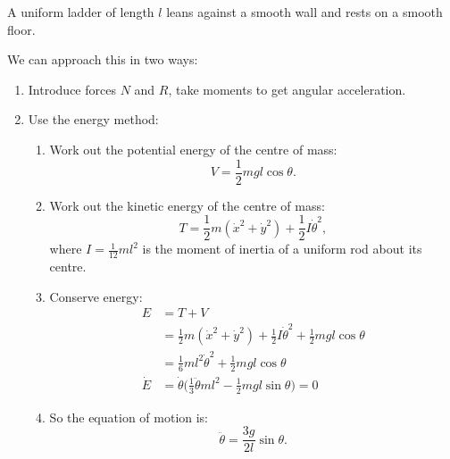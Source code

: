 \documentclass[a4paper]{article}
\begin{document}
\begin{eg}
  A uniform ladder of length $l$ leans against a smooth wall and rests on a smooth floor.
  
  \begin{center}
  \end{center}
  We can approach this in two ways:

  \begin{enumerate}
  \item Introduce forces $N$ and $R$, take moments to get angular acceleration.
  \item Use the energy method:
    \begin{enumerate}
    \item Work out the potential energy of the centre of mass: $$V = \frac{1}{2}mgl\cos\theta.$$
    \item Work out the kinetic energy of the centre of mass: $$T = \frac{1}{2}m(\dot{x}^2 + \dot{y}^2) + \frac{1}{2}I\dot{\theta}^2,$$ where $I=\frac{1}{12}ml^2$ is the moment of inertia of a uniform rod about its centre.
    \item Conserve energy:
      \begin{align*}
        E &= T + V \\
          &= \frac{1}{2}m(\dot{x}^2 + \dot{y}^2) + \frac{1}{2}I\dot{\theta}^2 + \frac{1}{2}mgl\cos\theta \\
          &= \frac{1}{6}ml^2\dot{\theta}^2 + \frac{1}{2}mgl\cos\theta \\
        \dot{E} &= \dot{\theta}\big(\frac{1}{3}\ddot{\theta}ml^2 - \frac{1}{2}mgl\sin\theta\big) = 0
      \end{align*}
    \item So the equation of motion is:
      $$\ddot{\theta} = \frac{3g}{2l}\sin\theta.$$
    \end{enumerate}
  \end{enumerate}
\end{eg}
\end{document}
